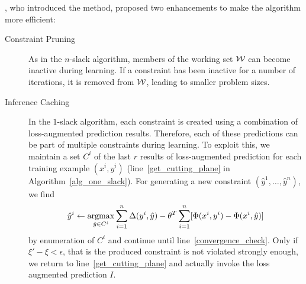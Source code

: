 \citet{joachims2009cutting}, who introduced the method, proposed two enhancements
to make the algorithm more efficient:
\begin{description}
    \item[Constraint Pruning] As in the $n$-slack algorithm, members of the
        working set $\mathcal{W}$ can become inactive during learning.  If a constraint
        has been inactive for a number of iterations, it is removed from $\mathcal{W}$,
        leading to smaller problem sizes.
    \item[Inference Caching] In the $1$-slack algorithm, each constraint is
        created using a combination of loss-augmented prediction results.
        Therefore, each of these predictions can be part of multiple
        constraints during learning.
        To exploit this, we maintain a set $C^i$ of the last $r$ results of
        loss-augmented prediction for each training example $(x^i, y^i)$
        (line~\ref{get_cutting_plane} in Algorithm~\ref{alg_one_slack}).
        For generating a new constraint $(\hat{y}^1, \dotsc, \hat{y}^n)$, we
        find
        \begin{equation}
            \hat{y}^i \leftarrow \operatorname*{argmax}_{\hat{y}\in C^i} \sum_{i=1}^n
            \Delta(y^i, \hat{y}) - \theta^T \sum_{i=1}^n [\Phi(x^i, y^i) -
                \Phi(x^i, \hat{y})] 
        \end{equation}
        by enumeration of $C^i$ and continue until
        line~\ref{convergence_check}.  Only if $\xi' - \xi < \epsilon$, that is
        the produced constraint is not violated strongly enough, we return to
        line~\ref{get_cutting_plane} and actually invoke the loss augmented
        prediction $I$.
\end{description}

 
